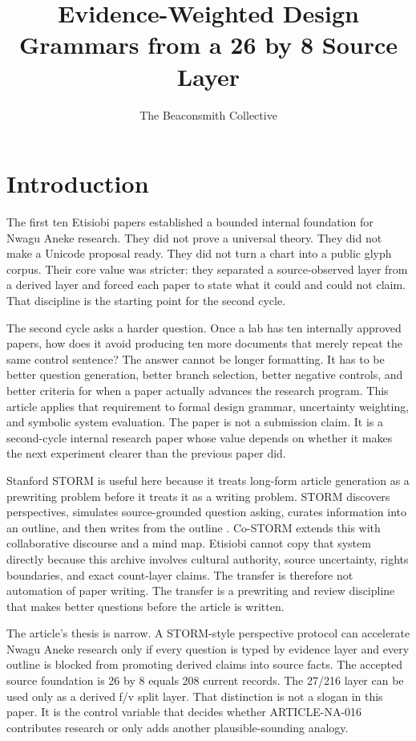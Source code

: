 \documentclass[sigconf,nonacm]{acmart}
\title{Evidence-Weighted Design Grammars from a 26 by 8 Source Layer}
\author{The Beaconsmith Collective}
\affiliation{\institution{Etisiobi Research Studio}\city{Enugu}\country{Nigeria}}
\begin{document}
\maketitle

\section{Introduction}
The first ten Etisiobi papers established a bounded internal foundation for
Nwagu Aneke research. They did not prove a universal theory. They did not make a
Unicode proposal ready. They did not turn a chart into a public glyph corpus.
Their core value was stricter: they separated a source-observed layer from a
derived layer and forced each paper to state what it could and could not claim.
That discipline is the starting point for the second cycle.

The second cycle asks a harder question. Once a lab has ten internally approved
papers, how does it avoid producing ten more documents that merely repeat the
same control sentence? The answer cannot be longer formatting. It has to be
better question generation, better branch selection, better negative controls,
and better criteria for when a paper actually advances the research program.
This article applies that requirement to formal design grammar, uncertainty weighting, and symbolic system evaluation. The paper is not a submission
claim. It is a second-cycle internal research paper whose value depends on
whether it makes the next experiment clearer than the previous paper did.

Stanford STORM is useful here because it treats long-form article generation as
a prewriting problem before it treats it as a writing problem. STORM discovers
perspectives, simulates source-grounded question asking, curates information
into an outline, and then writes from the outline \cite{shao2024storm,jiang2024costorm,gao2023alce,wadden2020scifact}. Co-STORM
extends this with collaborative discourse and a mind map. Etisiobi cannot copy
that system directly because this archive involves cultural authority, source
uncertainty, rights boundaries, and exact count-layer claims. The transfer is
therefore not automation of paper writing. The transfer is a prewriting and
review discipline that makes better questions before the article is written.

The article's thesis is narrow. A STORM-style perspective protocol can accelerate
Nwagu Aneke research only if every question is typed by evidence layer and every
outline is blocked from promoting derived claims into source facts. The accepted
source foundation is 26 by 8 equals 208 current records. The 27/216 layer can be
used only as a derived f/v split layer. That distinction is not a slogan in this
paper. It is the control variable that decides whether ARTICLE-NA-016 contributes
research or only adds another plausible-sounding analogy.
\end{document}
